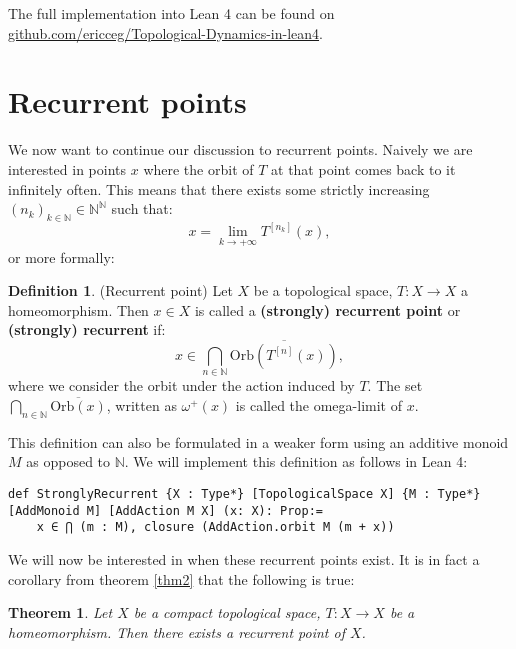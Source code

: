 \documentclass[11pt]{article}
\newtheorem{theorem}{Theorem}
\theoremstyle{definition}              %
\newtheorem{definition}{Definition}[section]
\theoremstyle{definition}              %
\theoremstyle{definition}              %
\begin{document}
The full implementation into Lean 4 can be found on \href{https://github.com/ericceg/Topological-Dynamics-in-lean4/blob/master/Project/Theorem.lean}{github.com/ericceg/Topological-Dynamics-in-lean4}.



\pagebreak
\section{Recurrent points}\label{recurrentpoints}
We now want to continue our discussion to recurrent points. Naively we are interested in points $x$ where the orbit of $T$ at that point comes back to it infinitely often. This means that there exists some strictly increasing $(n_k)_{k \in \mathbb{N}} \in \mathbb{N}^\mathbb{N}$ such that:
\begin{equation}
    x=\lim_{k \to +\infty} T^{[n_k]}(x),
\end{equation}
or more formally:

\begin{definition}(Recurrent point)
    Let $X$ be a topological space, $T:X \to X$ a homeomorphism. Then $x \in X$ is called a \textbf{(strongly) recurrent point} or \textbf{(strongly) recurrent} if:
    \begin{equation}
        x \in \bigcap_{n \in \mathbb{N}} \overline{\text{Orb}(T^{[n]}(x))},
    \end{equation}
    where we consider the orbit under the action induced by $T$. The set $\bigcap_{n \in \mathbb{N}} \overline{\text{Orb}(x)}$, written as $\omega^+(x)$ is called the omega-limit of $x$.
\end{definition}

This definition can also be formulated in a weaker form using an additive monoid $M$ as opposed to $\mathbb{N}$. We will implement this definition as follows in Lean 4:

\begin{lstlisting}
def StronglyRecurrent {X : Type*} [TopologicalSpace X] {M : Type*} [AddMonoid M] [AddAction M X] (x: X): Prop:=
    x ∈ ⋂ (m : M), closure (AddAction.orbit M (m + x))
\end{lstlisting}

We will now be interested in when these recurrent points exist. It is in fact a corollary from theorem \ref{thm2} that the following is true:

\begin{theorem}\label{thm3}
    Let $X$ be a compact topological space, $T:X \to X$ be a homeomorphism. Then there exists a recurrent point of $X$.
\end{theorem}
\end{document}
